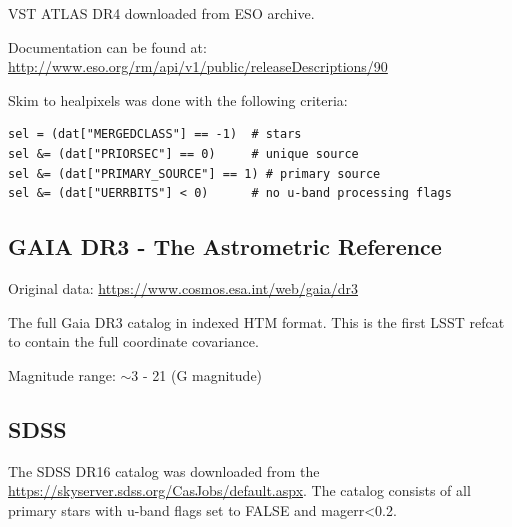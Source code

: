 VST ATLAS DR4 downloaded from ESO archive.

Documentation can be found at: \url{http://www.eso.org/rm/api/v1/public/releaseDescriptions/90}

Skim to healpixels was done with the following criteria:
\begin{verbatim}
sel = (dat["MERGEDCLASS"] == -1)  # stars
sel &= (dat["PRIORSEC"] == 0)     # unique source 
sel &= (dat["PRIMARY_SOURCE"] == 1) # primary source 
sel &= (dat["UERRBITS"] < 0)      # no u-band processing flags
\end{verbatim}

\subsection{GAIA DR3 - The Astrometric Reference}
\label{sec:gaiadr3}
Original data: \url{https://www.cosmos.esa.int/web/gaia/dr3}

The full Gaia DR3 catalog in indexed HTM format. 
This is the first LSST refcat to contain the full coordinate covariance.

Magnitude range: $\sim$3 - 21 (G magnitude)

\subsection{SDSS}
\label{sec:sdss}
The SDSS DR16 catalog was downloaded from the \href{SDSS SkyServer}{https://skyserver.sdss.org/CasJobs/default.aspx}.
The catalog consists of all primary stars with u-band flags set to FALSE and magerr<0.2.


